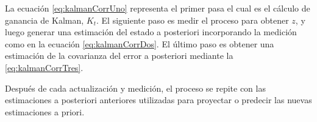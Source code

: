 La ecuación \eqref{eq:kalmanCorrUno} representa el primer pasa el cual es el cálculo de ganancia de Kalman, $K_t$. El siguiente paso es medir el proceso para obtener $z$, y luego generar una estimación del estado a posteriori incorporando la medición como en la ecuación \eqref{eq:kalmanCorrDos}. El último paso es obtener una estimación de la covarianza del error a posteriori mediante la \eqref{eq:kalmanCorrTres}.

Después de cada actualización y medición, el proceso se repite con las estimaciones a posteriori anteriores utilizadas para proyectar o predecir las nuevas estimaciones a priori.

